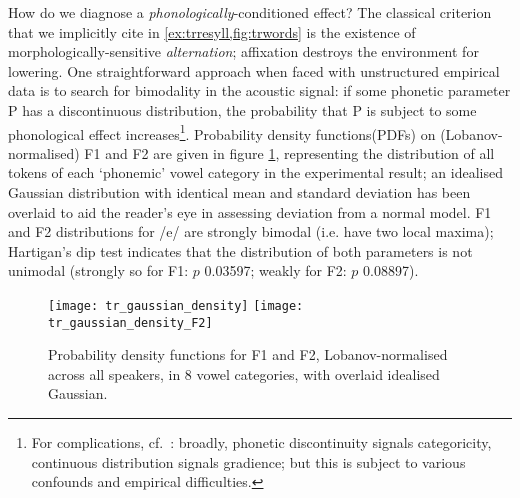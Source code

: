 How do we diagnose a \emph{phonologically}-conditioned effect? The classical criterion that we implicitly cite in \cref{ex:trresyll,fig:trwords} is the existence of morphologically-sensitive \emph{alternation}; affixation destroys the environment for lowering. One straightforward approach when faced with unstructured empirical data is to search for bimodality in the acoustic signal: if some phonetic parameter P has a discontinuous distribution, the probability that P is subject to some phonological effect increases\footnote{For complications, cf.~\citet{Scobbie2005}: broadly, phonetic discontinuity signals categoricity, continuous distribution signals gradience; but this is subject to various confounds and empirical difficulties.}. Probability density functions\footnotemark (PDFs) on (Lobanov-normalised) F1 and F2 are given in figure \ref{fig:trdensity}, representing the distribution of all tokens of each `phonemic' vowel category in the experimental result; an idealised Gaussian distribution with identical mean and standard deviation has been overlaid to aid the reader's eye in assessing deviation from a normal model. F1 and F2 distributions for /e/ are strongly bimodal (i.e. have two local maxima); Hartigan's dip test indicates that the distribution of both parameters is not unimodal (strongly so for F1: $p$ 0.03597; weakly for F2: $p$ 0.08897).


\begin{figure}[H]
  \texttt{[image: tr\_gaussian\_density]}
  \hfill
  \texttt{[image: tr\_gaussian\_density\_F2]}
  \caption[Probability density functions for F1 and F2, all categories.]{Probability density functions for F1 and F2, Lobanov-normalised across all speakers, in 8 vowel categories, with overlaid idealised Gaussian.}
  \label{fig:trdensity}
\end{figure}

